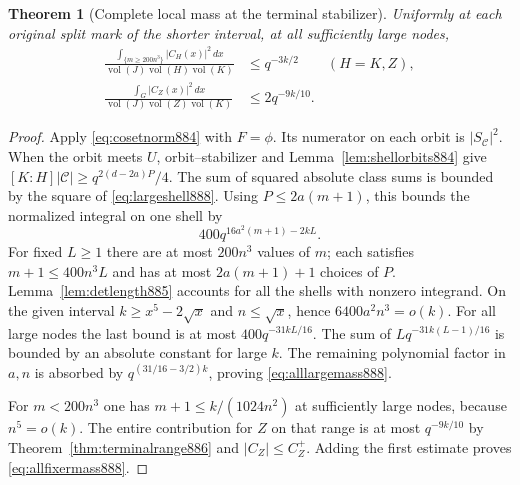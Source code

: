 \documentclass[a4paper,11pt]{article}
\newtheorem{theorem}[proposition]{Theorem}
\theoremstyle{definition}
\theoremstyle{remark}
\numberwithin{equation}{section}
\begin{document}
\begin{theorem}[Complete local mass at the terminal stabilizer]
\leavevmode\label{thm:allfixermass888}
Uniformly at each original split mark of the shorter interval,
at all sufficiently large nodes,
\begin{align}
 \frac{\int_{\{m\ge200n^3\}}|C_H(x)|^2\,dx}
      {\operatorname{vol}(J)\operatorname{vol}(H)\operatorname{vol}(K)}
      &\le q^{-3k/2}\qquad(H=K,Z), \label{eq:alllargemass888}\\
 \frac{\int_G|C_Z(x)|^2\,dx}
      {\operatorname{vol}(J)\operatorname{vol}(Z)\operatorname{vol}(K)}
      &\le 2q^{-9k/10}. \label{eq:allfixermass888}
\end{align}
\end{theorem}
\begin{proof}
Apply \eqref{eq:cosetnorm884} with \(F=\phi\). Its numerator
on each orbit is \(|S_{\mathcal C}|^2\). When the orbit meets
\(U\), orbit--stabilizer and Lemma~\ref{lem:shellorbits884}
give \([K:H]|\mathcal C|\ge q^{2(d-2a)P}/4\).
The sum of squared absolute class sums is bounded by the square of
\eqref{eq:largeshell888}. Using \(P\le2a(m+1)\), this bounds the
normalized integral on one shell by
\[
                     400q^{16a^2(m+1)-2kL}.
\]
For fixed \(L\ge1\) there are at most \(200n^3\) values of \(m\);
each satisfies \(m+1\le400n^3 L\) and has at most
\(2a(m+1)+1\) choices of \(P\). Lemma~\ref{lem:detlength885}
accounts for all the shells with nonzero integrand. On the
given interval \(k\ge x^5-2\sqrt{x}\) and \(n\le\sqrt{x}\),
hence \(6400a^2n^3=o(k)\). For all large nodes the last bound
is at most \(400q^{-31kL/16}\). The sum of
\(Lq^{-31k(L-1)/16}\) is bounded by an absolute constant for
large \(k\). The remaining polynomial factor in \(a,n\) is
absorbed by \(q^{(31/16-3/2)k}\), proving
\eqref{eq:alllargemass888}.

For \(m<200n^3\) one has \(m+1\le k/(1024n^2)\) at sufficiently
large nodes, because \(n^5=o(k)\). The entire contribution for
\(Z\) on that range is at most \(q^{-9k/10}\) by
Theorem~\ref{thm:terminalrange886} and \(|C_Z|\le C_Z^+\).
Adding the first estimate proves \eqref{eq:allfixermass888}.
\end{proof}
\end{document}
